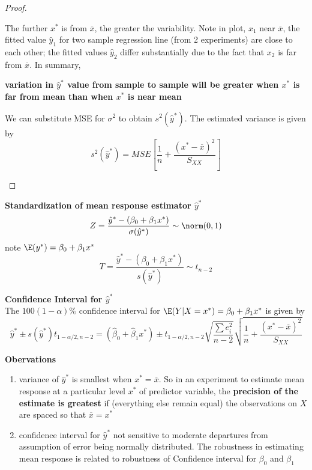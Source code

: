\documentclass[11pt]{article}
\begin{document}
\begin{defn*}
\begin{proof}
\begin{enumerate}
\[            \]
            The further $x^*$ is from $\overline{x}$, the greater the variability. Note in plot, $x_1$ near $\overline{x}$, the fitted value $\hat{y}_1$ for two sample regression line (from 2 experiments) are close to each other; the fitted values $\hat{y}_2$ differ substantially due to the fact that $x_2$ is far from $\overline{x}$. In summary, 
            \begin{center}
                \textbf{variation in $\hat{y}^*$ value from sample to sample will be greater when $x^*$ is far from mean than when $x^*$ is near mean} 
            \end{center}
            We can substitute MSE for $\sigma^2$ to obtain $s^2(\hat{y}^*)$. The estimated variance is given by
            \[
                 s^2(\hat{y}^*) = MSE \left[ \frac{1}{n} + \frac{(x^* - \overline{x})^2}{S_{XX}} \right]
            \]
        \end{enumerate}
    \end{proof}
\end{defn*}

\begin{defn*}
    \textbf{Standardization of mean response estimator $\hat{y}^*$}\\
    \[
        Z = \frac{\hat{y}^* - (\beta_0 + \beta_1 x^*)}{\sigma(\hat{y}^*)} \sim \norm(0,1)
    \]
    note $\E(y^*) = \beta_0 + \beta_1 x^*$
    \[
        T = \frac{\hat{y}^* - (\beta_0 + \beta_1 x^*)}{s(\hat{y}^*)} \sim t_{n-2}
    \]
\end{defn*}

\begin{defn*}
    \textbf{Confidence Interval for $\hat{y}^*$}\\
    The $100(1-\alpha)\%$ confidence interval for $\E(Y|X=x^*)=\beta_0 + \beta_1 x^*$ is given by
    \[
        \hat{y}^* \pm s(\hat{y}^*) t_{1-\alpha/2, n-2} = (\hat{\beta}_0 + \hat{\beta}_1 x^*) \pm t_{1-\alpha/2, n-2} \sqrt{\frac{\sum e_i^2}{n-2}}\sqrt{ \frac{1}{n} + \frac{(x^* - \overline{x})^2}{S_{XX}} }
    \]
\end{defn*}


\begin{defn*}
    \textbf{Obervations}
    \begin{enumerate}
        \item variance of $\hat{y}^*$ is smallest when $x^* = \overline{x}$. So in an experiment to estimate mean response at a particular level $x^*$ of predictor variable, the \textbf{precision of the estimate is greatest} if (everything else remain equal) the observations on $X$ are spaced so that $\overline{x} = x^*$
        \item confidence interval for $\hat{y}^*$ not sensitive to moderate departures from assumption of error being normally distributed. The robustness in estimating mean response is related to robustness of Confidence interval for $\beta_0$ and $\beta_1$
    \end{enumerate}
\end{defn*}
\end{document}
